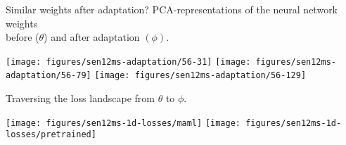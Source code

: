 \documentclass[11pt]{beamer}
\begin{document}
	\begin{frame}{Similar weights after adaptation?}
		PCA-representations of the neural network weights \\ before ($\theta$) and after adaptation $(\phi)$.
		
		\texttt{[image: figures/sen12ms-adaptation/56-31]}
		\texttt{[image: figures/sen12ms-adaptation/56-79]}
		\texttt{[image: figures/sen12ms-adaptation/56-129]}
		
		\vspace{1em}
		Traversing the loss landscape from $\theta$ to $\phi$.
		
		\texttt{[image: figures/sen12ms-1d-losses/maml]}
		\texttt{[image: figures/sen12ms-1d-losses/pretrained]}
	\end{frame}
	
%		
%		
%		
%		
\end{document}
